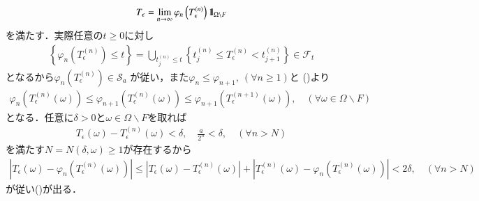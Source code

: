 \begin{prf}
\begin{description}
				\begin{align}
					T_\epsilon = \lim_{n \to \infty} \varphi_n\left(T^{(n)}_\epsilon\right) \mbox{1}\hspace{-0.25em}\mbox{l}_{\Omega \backslash F}
					\label{eq:chapter_1_theorem_4_14_3}
				\end{align}
				を満たす．実際任意の$t \geq 0$に対し
				\begin{align}
					\left\{\varphi_n\left(T^{(n)}_\epsilon\right) \leq t\right\}
					= \bigcup_{t^{(n)}_j \leq t} \left\{t^{(n)}_j \leq T^{(n)}_\epsilon < t^{(n)}_{j+1}\right\}
					\in \mathscr{F}_t
				\end{align}
				となるから$\varphi_n\left(T^{(n)}_\epsilon\right) \in \mathscr{S}_a$
				が従い，また$\varphi_n \leq \varphi_{n+1},\ (\forall n \geq 1)$と
				()より
				\begin{align}
					\varphi_n \left(T^{(n)}_\epsilon(\omega)\right)
					\leq \varphi_{n+1} \left(T^{(n)}_\epsilon(\omega)\right)
					\leq \varphi_{n+1} \left(T^{(n+1)}_\epsilon(\omega)\right),
					\quad (\forall \omega \in \Omega \backslash F)
				\end{align}
				となる．任意に$\delta > 0$と$\omega \in \Omega \backslash F$を取れば
				\begin{align}
					T_\epsilon(\omega) - T^{(n)}_\epsilon(\omega) < \delta,
					\quad \frac{a}{2^n} < \delta,
					\quad (\forall n > N)
				\end{align}
				を満たす$N = N(\delta,\omega) \geq 1$が存在するから
				\begin{align}
					\left|T_\epsilon(\omega) - \varphi_n\left(T^{(n)}_\epsilon(\omega)\right)\right|
					\leq \left|T_\epsilon(\omega) - T^{(n)}_\epsilon(\omega)\right|
						+ \left|T^{(n)}_\epsilon(\omega) - \varphi_n\left(T^{(n)}_\epsilon(\omega)\right)\right|
					< 2\delta,
					\quad (\forall n > N)
				\end{align}
				が従い()が出る．
			

\end{description}
\end{prf}
